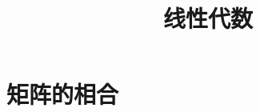 \documentclass[aspectratio=169,handout]{ctexbeamer}
\title{线性代数}
\begin{document}
\setcounter{part}{3}
\part{矩阵的相合}




\end{document}
